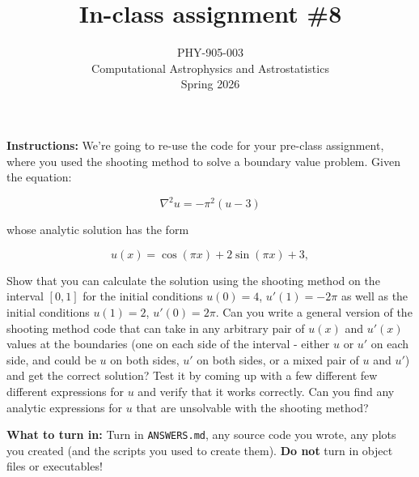 \documentclass[10pt]{article}
\title{In-class assignment \#8}
\author{PHY-905-003\\Computational Astrophysics and
  Astrostatistics\\Spring 2026}
\date{} %
\begin{document}
 
\maketitle

\vspace{-5mm}

\noindent \textbf{Instructions:}   We're going to re-use the code for
your pre-class assignment, where you used the shooting method to solve
a boundary value problem.  Given the equation:

\begin{equation}
\nabla^2 u = -\pi^2(u-3)
\end{equation}

whose analytic solution has the form 

\begin{equation}
u(x) = \cos(\pi x) + 2 \sin(\pi x) + 3,
\end{equation}

Show that you can calculate the solution using the shooting method on
the interval $[0,1]$ for the initial conditions $u(0) = 4$, $u'(1) =
-2\pi$ as well as the initial conditions $u(1) = 2$, $u'(0) = 2\pi$.
Can you write a general version of the shooting method code that can
take in any arbitrary pair of $u(x)$ and $u'(x)$ values at the
boundaries (one on each side of the interval - either $u$ or $u'$ on
each side, and could be $u$ on both sides, $u'$ on both sides, or a
mixed pair of $u$ and $u'$) and get the correct solution?  Test it by
coming up with a few different few different expressions for $u$ and
verify that it works correctly.  Can you find any analytic expressions
for $u$ that are unsolvable with the shooting method?

\vspace{5mm}

\noindent 
\textbf{What to turn in:} Turn in \texttt{ANSWERS.md}, any
source code you wrote, any plots you created (and the scripts you used
to create them).  \textbf{Do not} turn in object files or
executables!
\end{document}
